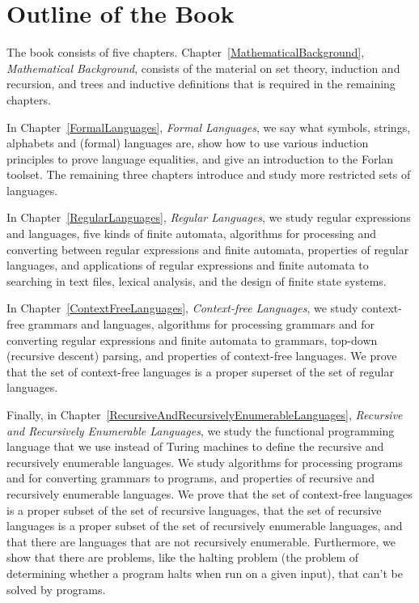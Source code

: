 \section*{Outline of the Book}
\label{OutlineOfTheBook}

The book consists of five chapters.
Chapter~\ref{MathematicalBackground}, \emph{Mathematical Background},
consists of the material on set theory, induction and recursion, and
trees and inductive definitions that is required in the remaining
chapters.

In Chapter~\ref{FormalLanguages}, \emph{Formal Languages},
we say what symbols, strings, alphabets and (formal) languages are,
show how to use various induction principles to prove language
equalities, and give an introduction to the Forlan toolset.  The
remaining three chapters introduce and study more restricted sets of
languages.

In Chapter~\ref{RegularLanguages}, \emph{Regular Languages}, we study
regular expressions and languages, five kinds of finite automata,
algorithms for processing and converting between regular expressions
and finite automata, properties of regular languages, and applications
of regular expressions and finite automata to searching in text files,
lexical analysis, and the design of finite state systems.

In Chapter~\ref{ContextFreeLanguages}, \emph{Context-free Languages},
we study context-free grammars and languages, algorithms for
processing grammars and for converting regular expressions and finite
automata to grammars, top-down (recursive descent) parsing, and
properties of context-free languages.  We prove that the set of context-free
languages is a proper superset of the set of regular languages.

Finally, in Chapter~\ref{RecursiveAndRecursivelyEnumerableLanguages},
\emph{Recursive and Recursively Enumerable Languages}, we study the
functional programming language that we use instead of Turing machines
to define the recursive and recursively enumerable languages.  We
study algorithms for processing programs and for converting grammars
to programs, and properties of recursive and recursively enumerable
languages.  We prove that the set of context-free languages is a
proper subset of the set of recursive languages, that the set of
recursive languages is a proper subset of the set of recursively
enumerable languages, and that there are languages that are not
recursively enumerable.  Furthermore, we show that there are problems,
like the halting problem (the problem of determining whether a program
halts when run on a given input), that can't be solved by programs.


